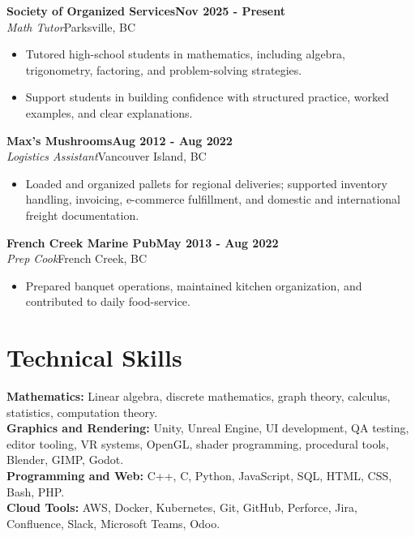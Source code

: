 \documentclass[10pt]{article}
\newcommand{\job}[4]{%
	\textbf{#1}\hfill\textbf{#4}\\
	\textit{#2}\hfill#3%
	\vspace{0pt}
}
\newcommand{\jobspace}{\vspace{6pt}}
\begin{document}
\job{Society of Organized Services}{Math Tutor}{Parksville, BC}{Nov 2025 - Present}
\begin{itemize}[nosep]
	\item Tutored high-school students in mathematics, including algebra, trigonometry, factoring, and problem-solving strategies.
	\item Support students in building confidence with structured practice, worked examples, and clear explanations.
\end{itemize}
\jobspace

\job{Max's Mushrooms}{Logistics Assistant}{Vancouver Island, BC }{Aug 2012 - Aug 2022}
\begin{itemize}[nosep]
	\item Loaded and organized pallets for regional deliveries; supported inventory handling, invoicing, e-commerce fulfillment, and domestic and international freight documentation.
\end{itemize}
\jobspace

\job{French Creek Marine Pub}{Prep Cook}{French Creek, BC}{May 2013 - Aug 2022}
\begin{itemize}[nosep]
	\item Prepared banquet operations, maintained kitchen organization, and contributed to daily food-service.
\end{itemize}
\jobspace

\section*{Technical Skills}

\textbf{Mathematics:} Linear algebra, discrete mathematics, graph theory, calculus, statistics, computation theory.\\
\textbf{Graphics and Rendering:} Unity, Unreal Engine, UI development, QA testing, editor tooling, VR systems, OpenGL, shader programming, procedural tools, Blender, GIMP, Godot.\\
\textbf{Programming and Web:} C++, C, Python, JavaScript, SQL, HTML, CSS, Bash, PHP.\\
\textbf{Cloud Tools:} AWS, Docker, Kubernetes, Git, GitHub, Perforce, Jira, Confluence, Slack, Microsoft Teams, Odoo.
\end{document}
